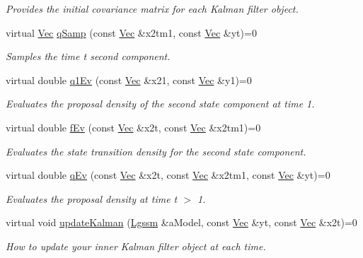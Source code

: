 \begin{DoxyCompactItemize}
\begin{DoxyCompactList}\small\item\em Provides the initial covariance matrix for each Kalman filter object. \end{DoxyCompactList}\item 
virtual \hyperlink{apf__filter_8h_a4c7df05c6f5e8a0d15ae14bcdbc07152}{Vec} \hyperlink{classKalman__RBPF_ad3ee89a06a18a287445e366230a6bd65}{q\+Samp} (const \hyperlink{apf__filter_8h_a4c7df05c6f5e8a0d15ae14bcdbc07152}{Vec} \&x2tm1, const \hyperlink{apf__filter_8h_a4c7df05c6f5e8a0d15ae14bcdbc07152}{Vec} \&yt)=0
\begin{DoxyCompactList}\small\item\em Samples the time t second component. \end{DoxyCompactList}\item 
virtual double \hyperlink{classKalman__RBPF_a36b66fd90b6d810d88e5ec9785cb0307}{q1\+Ev} (const \hyperlink{apf__filter_8h_a4c7df05c6f5e8a0d15ae14bcdbc07152}{Vec} \&x21, const \hyperlink{apf__filter_8h_a4c7df05c6f5e8a0d15ae14bcdbc07152}{Vec} \&y1)=0
\begin{DoxyCompactList}\small\item\em Evaluates the proposal density of the second state component at time 1. \end{DoxyCompactList}\item 
virtual double \hyperlink{classKalman__RBPF_a03bfc2e7f32a86ab4fe653958d2f7dd4}{f\+Ev} (const \hyperlink{apf__filter_8h_a4c7df05c6f5e8a0d15ae14bcdbc07152}{Vec} \&x2t, const \hyperlink{apf__filter_8h_a4c7df05c6f5e8a0d15ae14bcdbc07152}{Vec} \&x2tm1)=0
\begin{DoxyCompactList}\small\item\em Evaluates the state transition density for the second state component. \end{DoxyCompactList}\item 
virtual double \hyperlink{classKalman__RBPF_ad5b8e717c5d4c838b0d246b496971d16}{q\+Ev} (const \hyperlink{apf__filter_8h_a4c7df05c6f5e8a0d15ae14bcdbc07152}{Vec} \&x2t, const \hyperlink{apf__filter_8h_a4c7df05c6f5e8a0d15ae14bcdbc07152}{Vec} \&x2tm1, const \hyperlink{apf__filter_8h_a4c7df05c6f5e8a0d15ae14bcdbc07152}{Vec} \&yt)=0
\begin{DoxyCompactList}\small\item\em Evaluates the proposal density at time t $>$ 1. \end{DoxyCompactList}\item 
virtual void \hyperlink{classKalman__RBPF_a67abffa6fe0510147037ed102aa30ed0}{update\+Kalman} (\hyperlink{classLgssm}{Lgssm} \&a\+Model, const \hyperlink{apf__filter_8h_a4c7df05c6f5e8a0d15ae14bcdbc07152}{Vec} \&yt, const \hyperlink{apf__filter_8h_a4c7df05c6f5e8a0d15ae14bcdbc07152}{Vec} \&x2t)=0
\begin{DoxyCompactList}\small\item\em How to update your inner Kalman filter object at each time. \end{DoxyCompactList}\end{DoxyCompactItemize}


